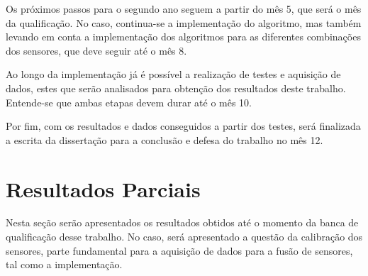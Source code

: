 \documentclass[acronym, symbols, table]{fei}
\begin{document}
		Os próximos passos para o segundo ano seguem a partir do mês 5, que será o mês da qualificação. No caso, continua-se a implementação do algoritmo, mas também levando em conta a implementação dos algoritmos para as diferentes combinações dos sensores, que deve seguir até o mês 8.
		
		Ao longo da implementação já é possível a realização de testes e aquisição de dados, estes que serão analisados para obtenção dos resultados deste trabalho. Entende-se que ambas etapas devem durar até o mês 10.
		
		Por fim, com os resultados e dados conseguidos a partir dos testes, será finalizada a escrita da dissertação para a conclusão e defesa do trabalho no mês 12.
		
	\chapter{Resultados Parciais}
		Nesta seção serão apresentados os resultados obtidos até o momento da banca de qualificação desse trabalho. No caso, será apresentado a questão da calibração dos sensores, parte fundamental para a aquisição de dados para a fusão de sensores, tal como a implementação.
	
	\printbibliography
\end{document}
